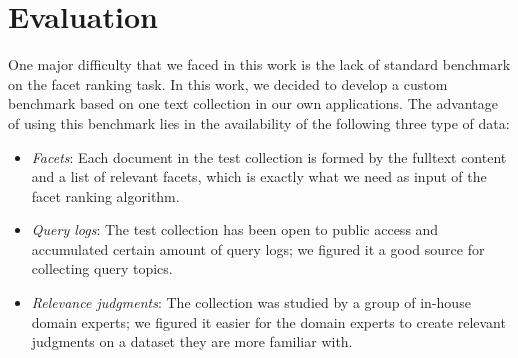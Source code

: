 \section{Evaluation}


One major difficulty that we faced in this work is the lack of standard
benchmark on the facet ranking task.  In this work, we decided to develop a
custom benchmark based on one text collection in our own applications.  The
advantage of using this benchmark lies in the availability of the following
three type of data:
\begin{itemize} \item \emph{Facets}: Each document in the test collection is
formed by the fulltext content and a list of relevant facets, which is exactly
what we need as input of the facet ranking algorithm.  \item \emph{Query logs}:
The test collection has been open to public access and accumulated certain
amount of query logs; we figured it a good source for collecting query topics.
\item \emph{Relevance judgments}: The collection was studied by a group of
in-house domain experts; we figured it easier for the domain experts to create
relevant judgments on a dataset they are more familiar with.  \end{itemize}

